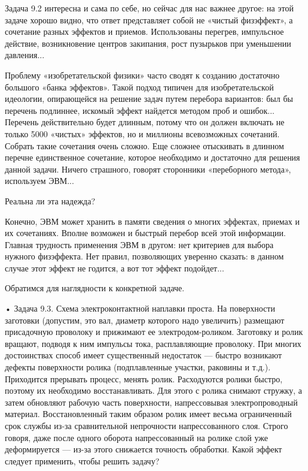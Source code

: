 Задача 9.2 интересна и сама по  себе, но сейчас для нас важнее другое:
на этой задаче  хорошо видно, что ответ представляет  собой не «чистый
физэффект»,  а  сочетание  разных  эффектов  и  приемов.  Использованы
перегрев, импульсное  действие, возникновение центров  закипания, рост
пузырьков при уменьшении давления...

Проблему «изобретательской физики» часто  сводят к созданию достаточно
большого «банка  эффектов». Такой подход типичен  для изобретательской
идеологии,  опирающейся на  решение  задач  путем перебора  вариантов:
был  бы  перечень  подлиннее,  искомый эффект  найдется  методом  проб
и  ошибок...  Перечень  действительно  будет длинным,  потому  что  он
должен  включать  не только  5000  «чистых»  эффектов, но  и  миллионы
всевозможных  сочетаний. Собрать  такие  сочетания  очень сложно.  Еще
сложнее отыскивать  в длинном перечне единственное  сочетание, которое
необходимо и  достаточно для решения данной  задачи. Ничего страшного,
говорят сторонники «переборного метода», используем ЭВМ...

Реальна ли эта надежда?

Конечно,  ЭВМ  может хранить  в  памяти  сведения о  многих  эффектах,
приемах и их  сочетаниях. Вполне возможен и быстрый  перебор всей этой
информации. Главная  трудность применения ЭВМ в  другом: нет критериев
для  выбора  нужного  физэффекта.  Нет  правил,  позволяющих  уверенно
сказать: в  данном случае  этот эффект  не годится,  а вот  тот эффект
подойдет...

Обратимся для наглядности к конкретной задаче.

•   Задача   9.3.   Схема  электроконтактной   наплавки   проста.   На
поверхности   заготовки   (допустим,   это   вал,   диаметр   которого
надо  увеличить)  размещают  присадочную   проволоку  и  прижимают  ее
электродом-роликом.  Заготовку   и  ролик   вращают,  подводя   к  ним
импульсы  тока,  расплавляющие   проволоку.  При  многих  достоинствах
способ  имеет  существенный  недостаток  —  быстро  возникают  дефекты
поверхности   ролика  (подплавленные   участки,   раковины  и   т.д.).
Приходится прерывать процесс, менять ролик. Расходуются ролики быстро,
поэтому  их необходимо  восстанавливать.  Для этого  с ролика  снимают
стружку, а  затем обновляют  рабочую часть  поверхности, напрессовывая
электропроводный материал.  Восстановленный таким образом  ролик имеет
весьма  ограниченный  срок   службы  из-за  сравнительной  непрочности
напрессованного  слоя.  Строго  говоря,   даже  после  одного  оборота
напрессованный  на  ролике  слой   уже  деформируется  —  из-за  этого
снижается точность  обработки. Какой  эффект следует  применить, чтобы
решить задачу?

